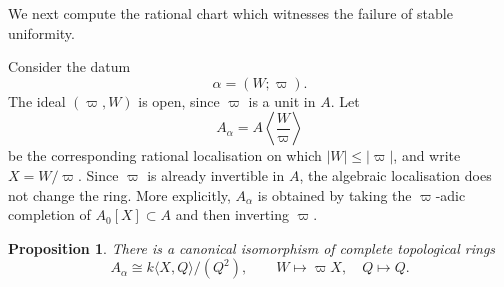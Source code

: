 \documentclass[11pt,reqno]{amsart}
\newtheorem{proposition}[proposition]{Proposition}
\theoremstyle{definition}
\begin{document}
We next compute the rational chart which witnesses the failure of stable
uniformity.

Consider the datum
\[
  \alpha=(W;\varpi).
\]
The ideal \((\varpi,W)\) is open, since \(\varpi\) is a unit in \(A\).  Let
\[
  A_\alpha=A\left\langle\frac{W}{\varpi}\right\rangle
\]
be the corresponding rational localisation on which $|W|\leq |\varpi|$, and write
$X=W/\varpi$.  Since $\varpi$ is already invertible in $A$, the algebraic
localisation does not change the ring.  More explicitly,
$A_\alpha$ is obtained by taking the $\varpi$-adic
completion of $A_0[X]\subset A$ and then inverting $\varpi$.

\begin{proposition}\label{prop:bad-chart}
There is a canonical isomorphism of complete topological rings
\[
  A_\alpha\cong k\langle X,Q\rangle/(Q^2),
  \qquad W\longmapsto\varpi X,\quad Q\longmapsto Q.
\]
\end{proposition}
\end{document}
